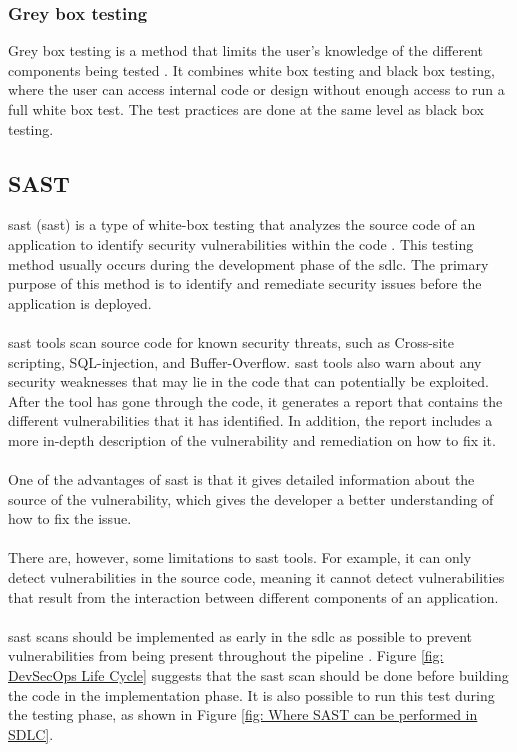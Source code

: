 \subsubsection{Grey box testing}
Grey box testing is a method that limits the user's knowledge of the different components being tested \cite{GreyBox}. It combines white box testing and black box testing, where the user can access internal code or design without enough access to run a full white box test. The test practices are done at the same level as black box testing. 

\subsection{SAST}
\acrlong{sast} (\acrshort{sast}) is a type of white-box testing that analyzes the source code of an application to identify security vulnerabilities within the code \cite{sast}. This testing method usually occurs during the development phase of the \acrlong{sdlc}. The primary purpose of this method is to identify and remediate security issues before the application is deployed. 
\\~\\
\acrshort{sast} tools scan source code for known security threats, such as \gls{Cross-site scripting}, \gls{SQL-injection}, and \gls{Buffer-Overflow}. \acrshort{sast} tools also warn about any security weaknesses that may lie in the code that can potentially be exploited. After the tool has gone through the code, it generates a report that contains the different vulnerabilities that it has identified. In addition, the report includes a more in-depth description of the vulnerability and remediation on how to fix it. 
\\~\\
One of the advantages of \acrshort{sast} is that it gives detailed information about the source of the vulnerability, which gives the developer a better understanding of how to fix the issue. 
\\~\\
There are, however, some limitations to \acrshort{sast} tools. For example, it can only detect vulnerabilities in the source code, meaning it cannot detect vulnerabilities that result from the interaction between different components of an application.
\\~\\
\acrshort{sast} scans should be implemented as early in the \acrshort{sdlc} as possible to prevent vulnerabilities from being present throughout the \gls{pipeline} \cite{SASTplacement}. Figure \ref{fig: DevSecOps Life Cycle} suggests that the \acrshort{sast} scan should be done before building the code in the implementation phase. It is also possible to run this test during the testing phase, as shown in Figure \ref{fig: Where SAST can be performed in SDLC}.

